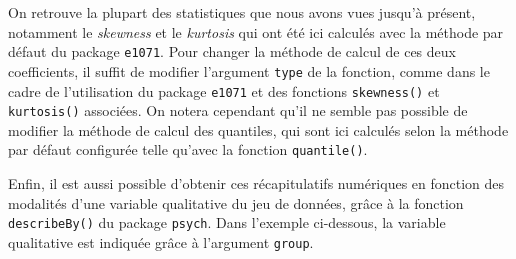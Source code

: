 \documentclass[
  french,
]{book}
\newenvironment{Shaded}{\begin{snugshade}}{\end{snugshade}}
\newcommand{\DataTypeTok}[1]{\textcolor[rgb]{0.13,0.29,0.53}{#1}}
\newcommand{\FloatTok}[1]{\textcolor[rgb]{0.00,0.00,0.81}{#1}}
\newcommand{\KeywordTok}[1]{\textcolor[rgb]{0.13,0.29,0.53}{\textbf{#1}}}
\newcommand{\NormalTok}[1]{#1}
\newcommand{\OperatorTok}[1]{\textcolor[rgb]{0.81,0.36,0.00}{\textbf{#1}}}
\begin{document}
On retrouve la plupart des statistiques que nous avons vues jusqu'à présent, notamment le \emph{skewness} et le \emph{kurtosis} qui ont été ici calculés avec la méthode par défaut du package \texttt{e1071}. Pour changer la méthode de calcul de ces deux coefficients, il suffit de modifier l'argument \texttt{type} de la fonction, comme dans le cadre de l'utilisation du package \texttt{e1071} et des fonctions \texttt{skewness()} et \texttt{kurtosis()} associées. On notera cependant qu'il ne semble pas possible de modifier la méthode de calcul des quantiles, qui sont ici calculés selon la méthode par défaut configurée telle qu'avec la fonction \texttt{quantile()}.

Enfin, il est aussi possible d'obtenir ces récapitulatifs numériques en fonction des modalités d'une variable qualitative du jeu de données, grâce à la fonction \texttt{describeBy()} du package \texttt{psych}. Dans l'exemple ci-dessous, la variable qualitative est indiquée grâce à l'argument \texttt{group}.

\begin{Shaded}
\end{Shaded}
\end{document}

